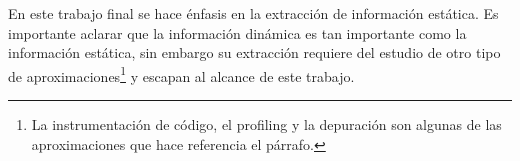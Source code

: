 %
%
% 
%







En este trabajo final se hace énfasis en la extracción de información estática. Es importante aclarar que la información dinámica es tan importante como la información estática, sin embargo su extracción requiere del estudio de otro tipo de aproximaciones\footnote[1]{La instrumentación de código, el profiling y la depuración son algunas de las aproximaciones que hace referencia el párrafo.} y escapan al alcance de este trabajo.

